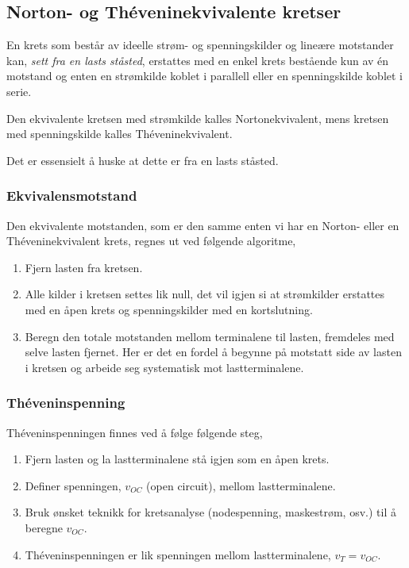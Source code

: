 \documentclass[norsk, a4paper, 12pt, twoside, titlepage]{article}
\begin{document}
\subsection{Norton- og Théveninekvivalente kretser}
\label{avs:norton- og théveninekvivalente kretser}
En krets som består av ideelle strøm- og spenningskilder og lineære
motstander kan, \emph{sett fra en lasts ståsted}, erstattes med en
enkel krets bestående kun av én motstand og enten en strømkilde
koblet i parallell eller en spenningskilde koblet i serie.

Den ekvivalente kretsen med strømkilde kalles Nortonekvivalent, mens
kretsen med spenningskilde kalles Théveninekvivalent.

Det er essensielt å huske at dette er fra en lasts ståsted.

\subsubsection{Ekvivalensmotstand}
Den ekvivalente motstanden, som er den samme enten vi har en Norton-
eller en Théveninekvivalent krets, regnes ut ved følgende algoritme,

\begin{enumerate}
\item Fjern lasten fra kretsen.
\item Alle kilder i kretsen settes lik null, det vil igjen si at
  strømkilder erstattes med en åpen krets og spenningskilder med en
  kortslutning.
\item Beregn den totale motstanden mellom terminalene til lasten,
  fremdeles med selve lasten fjernet. Her er det en fordel å begynne
  på motstatt side av lasten i kretsen og arbeide seg systematisk mot
  lastterminalene.
\end{enumerate}

\subsubsection{Théveninspenning}
Théveninspenningen finnes ved å følge følgende steg,
\begin{enumerate}
\item Fjern lasten og la lastterminalene stå igjen som en åpen krets.
\item Definer spenningen, $v_{OC}$ (open circuit), mellom
  lastterminalene.
\item Bruk ønsket teknikk for kretsanalyse (nodespenning, maskestrøm,
  osv.) til å beregne $v_{OC}$.
\item Théveninspenningen er lik spenningen mellom lastterminalene,
  $v_{T} = v_{OC}$.
\end{enumerate}
\end{document}
